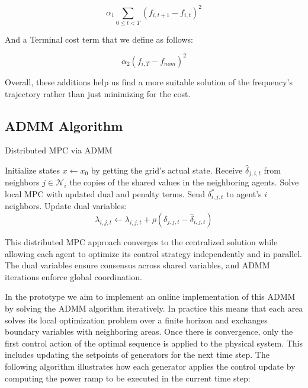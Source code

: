 \documentclass{article}
\begin{document}
\begin{equation}
    \alpha_1 \sum_{0 \leq t < T}(f_{i,t+1} - f_{i,t})^2 
\end{equation}

And a Terminal cost term that we define as follows:

\begin{equation}
    \alpha_2 (f_{i,T} - f_{nom})^2 
\end{equation}

Overall, these additions help us find a more suitable solution of the frequency's trajectory rather than just minimizing for the cost.

\subsection{ADMM Algorithm}

\begin{algorithm}[H]
\caption{Distributed MPC via ADMM}
\begin{algorithmic}[1]
    \State Initialize states $x \gets x_0$ by getting the grid's actual state.
            \State Receive $\hat{\delta}_{j,i,t}$ from neighbors $j \in \mathcal{N}_i$ the copies of the shared values in the neighboring agents.
            \State Solve local MPC with updated dual and penalty terms.
            \State Send $\delta^*_{i,j,t}$ to agent's $i$ neighbors. 
        \EndFor
            \State Update dual variables:
            \[
                \lambda_{i,j,t} \gets \lambda_{i,j,t} + \rho (\delta_{j,j,t} - \hat{\delta}_{i,j,t})
            \]
        \EndFor
    \EndWhile
\end{algorithmic}
\end{algorithm}

This distributed MPC approach converges to the centralized solution while allowing each agent to optimize its control strategy independently and in parallel. The dual variables ensure consensus across shared variables, and ADMM iterations enforce global coordination. 

In the prototype we aim to implement an online implementation of this ADMM by solving the ADMM algorithm iteratively. In practice this means that each area solves its local optimization problem over a finite horizon and exchanges boundary variables  with neighboring areas. Once there is convergence, only the first control action of the optimal sequence is applied to the physical system. This includes updating the setpoints of generators for the next time step. The following algorithm illustrates how each generator applies the control update by computing the power ramp to be executed in the current time step:
\end{document}
